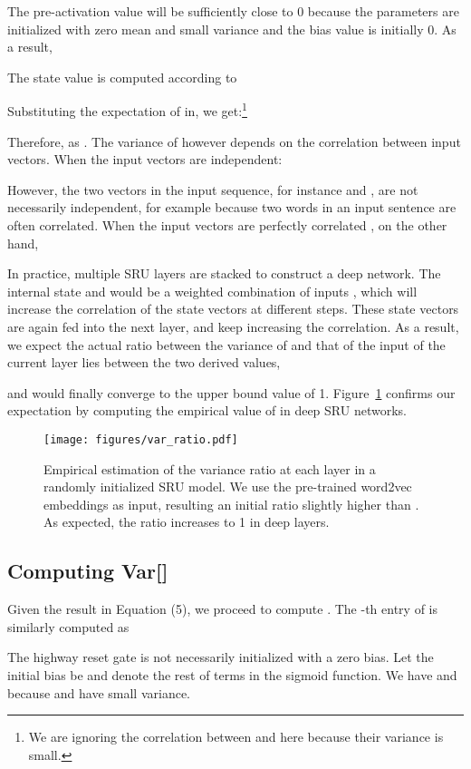 \documentclass[11pt,a4paper]{article}
\begin{document}
The pre-activation value will be sufficiently close to 0 because the parameters are initialized with zero mean and small variance and the bias value is initially 0.
As a result,

The state value  is computed according to

Substituting the expectation of  in, we get:\footnote{We are ignoring the correlation between  and  here because their variance is small.}

Therefore,  as .
The variance of  however depends on the correlation between input vectors.
When the input vectors are independent: 

However, the two vectors in the input sequence, for instance  and , are not necessarily independent, for example because two words in an input sentence are often correlated.
When the input vectors are perfectly correlated , on the other hand, 


In practice, multiple SRU layers are stacked to construct a deep network.
The internal state  and  would be a weighted combination of inputs , which will increase the correlation of the state vectors at different steps.
These state vectors are again fed into the next layer, and keep increasing the correlation. 
As a result, we expect the actual ratio between the variance of  and that of the input of the current layer  lies between the two derived values,

and would finally converge to the upper bound value of 1.
Figure~\ref{fig:var} confirms our expectation by computing the empirical value of  in deep SRU networks.
\begin{figure}[!t!]
\vspace{0.1in}
\texttt{[image: figures/var\_ratio.pdf]}
\caption{Empirical estimation of the variance ratio  at each layer in a randomly initialized SRU model.
We use the pre-trained word2vec embeddings as input, resulting an initial ratio slightly higher than .
As expected, the ratio increases to 1 in deep layers.
}
\label{fig:var}
\end{figure}

\subsection{Computing Var[]}
Given the result in Equation (5), we  proceed to compute .
The -th entry of  is similarly computed as

The highway reset gate is not necessarily initialized with a zero bias.
Let the initial bias be  and  denote the rest of terms in the sigmoid function.
We have  and  because  and  have small variance.
\end{document}
